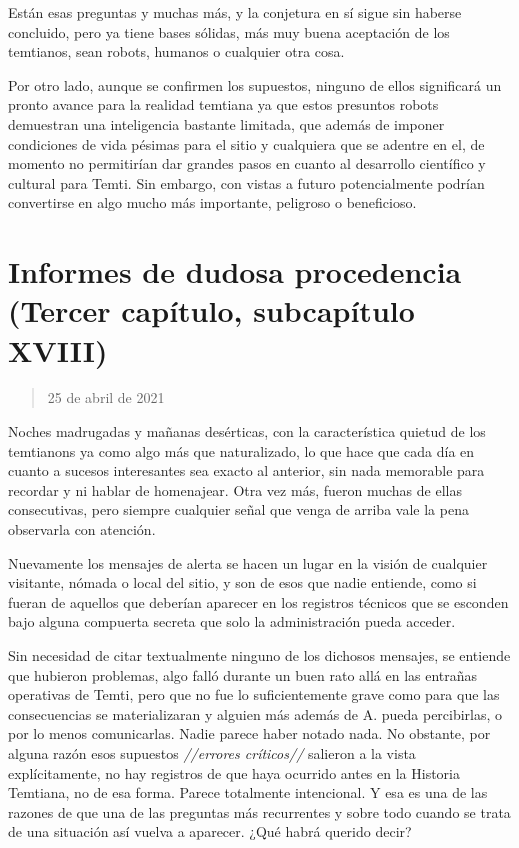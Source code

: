 \documentclass[
  spanish,
]{book}
\begin{document}
Están esas preguntas y muchas más, y la conjetura en sí sigue sin haberse concluido, pero ya tiene bases sólidas, más muy buena aceptación de los temtianos, sean robots, humanos o cualquier otra cosa.

Por otro lado, aunque se confirmen los supuestos, ninguno de ellos significará un pronto avance para la realidad temtiana ya que estos presuntos robots demuestran una inteligencia bastante limitada, que además de imponer condiciones de vida pésimas para el sitio y cualquiera que se adentre en el, de momento no permitirían dar grandes pasos en cuanto al desarrollo científico y cultural para Temti. Sin embargo, con vistas a futuro potencialmente podrían convertirse en algo mucho más importante, peligroso o beneficioso.

\hypertarget{informes-de-dudosa-procedencia-tercer-capuxedtulo-subcapuxedtulo-xviii}{%
\section{Informes de dudosa procedencia (Tercer capítulo, subcapítulo XVIII)}\label{informes-de-dudosa-procedencia-tercer-capuxedtulo-subcapuxedtulo-xviii}}

\begin{quote}
25 de abril de 2021
\end{quote}

Noches madrugadas y mañanas desérticas, con la característica quietud de los temtianons ya como algo más que naturalizado, lo que hace que cada día en cuanto a sucesos interesantes sea exacto al anterior, sin nada memorable para recordar y ni hablar de homenajear. Otra vez más, fueron muchas de ellas consecutivas, pero siempre cualquier señal que venga de arriba vale la pena observarla con atención.

Nuevamente los mensajes de alerta se hacen un lugar en la visión de cualquier visitante, nómada o local del sitio, y son de esos que nadie entiende, como si fueran de aquellos que deberían aparecer en los registros técnicos que se esconden bajo alguna compuerta secreta que solo la administración pueda acceder.

Sin necesidad de citar textualmente ninguno de los dichosos mensajes, se entiende que hubieron problemas, algo falló durante un buen rato allá en las entrañas operativas de Temti, pero que no fue lo suficientemente grave como para que las consecuencias se materializaran y alguien más además de A. pueda percibirlas, o por lo menos comunicarlas. Nadie parece haber notado nada. No obstante, por alguna razón esos supuestos \emph{//errores críticos//} salieron a la vista explícitamente, no hay registros de que haya ocurrido antes en la Historia Temtiana, no de esa forma. Parece totalmente intencional. Y esa es una de las razones de que una de las preguntas más recurrentes y sobre todo cuando se trata de una situación así vuelva a aparecer. ¿Qué habrá querido decir?
\end{document}
